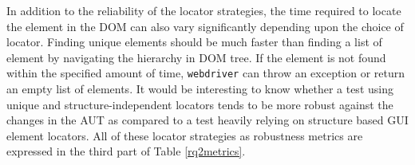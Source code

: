 In addition to the reliability of the locator strategies, the time required to locate the element in the DOM can also vary significantly depending upon the choice of locator. Finding unique elements should be much faster than finding a list of element by navigating the hierarchy in DOM tree. If the element is not found within the specified amount of time, \texttt{webdriver} can throw an exception or return an empty list of elements. It would be interesting to know whether a test using unique and structure-independent locators tends to be more robust against the changes in the AUT as compared to a test heavily relying on structure based GUI element locators. All of these locator strategies as robustness metrics are expressed in the third part of Table \ref{rq2metrics}.  











